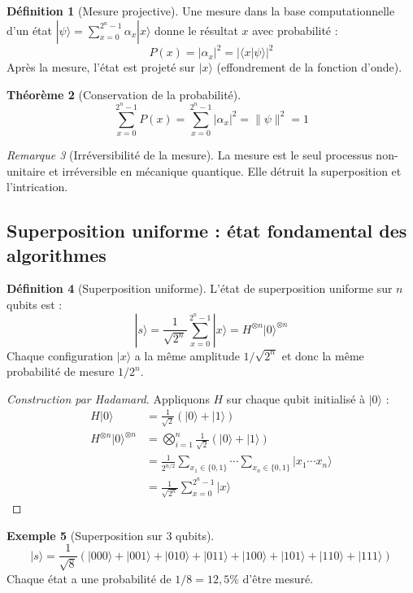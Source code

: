 \documentclass[12pt,a4paper]{article}
\newtheorem{theorem}{Théorème}[section]
\theoremstyle{definition}
\newtheorem{definition}[theorem]{Définition}
\newtheorem{example}[theorem]{Exemple}
\theoremstyle{remark}
\newtheorem{remark}[theorem]{Remarque}
\begin{document}
\begin{definition}[Mesure projective]
Une mesure dans la base computationnelle d'un état $|\psi\rangle = \sum_{x=0}^{2^n-1} \alpha_x |x\rangle$ donne le résultat $x$ avec probabilité :
\[
P(x) = |\alpha_x|^2 = |\langle x | \psi \rangle|^2
\]
Après la mesure, l'état est projeté sur $|x\rangle$ (effondrement de la fonction d'onde).
\end{definition}

\begin{theorem}[Conservation de la probabilité]
\[
\sum_{x=0}^{2^n-1} P(x) = \sum_{x=0}^{2^n-1} |\alpha_x|^2 = \|\psi\|^2 = 1
\]
\end{theorem}

\begin{remark}[Irréversibilité de la mesure]
La mesure est le seul processus non-unitaire et irréversible en mécanique quantique. Elle détruit la superposition et l'intrication.
\end{remark}

\subsection{Superposition uniforme : état fondamental des algorithmes}

\begin{definition}[Superposition uniforme]
L'état de superposition uniforme sur $n$ qubits est :
\[
|s\rangle = \frac{1}{\sqrt{2^n}} \sum_{x=0}^{2^n-1} |x\rangle = H^{\otimes n} |0\rangle^{\otimes n}
\]
Chaque configuration $|x\rangle$ a la même amplitude $1/\sqrt{2^n}$ et donc la même probabilité de mesure $1/2^n$.
\end{definition}

\begin{proof}[Construction par Hadamard]
Appliquons $H$ sur chaque qubit initialisé à $|0\rangle$ :
\begin{align*}
H|0\rangle &= \frac{1}{\sqrt{2}}(|0\rangle + |1\rangle) \\
H^{\otimes n}|0\rangle^{\otimes n} &= \bigotimes_{i=1}^n \frac{1}{\sqrt{2}}(|0\rangle + |1\rangle) \\
&= \frac{1}{2^{n/2}} \sum_{x_1 \in \{0,1\}} \cdots \sum_{x_n \in \{0,1\}} |x_1 \cdots x_n\rangle \\
&= \frac{1}{\sqrt{2^n}} \sum_{x=0}^{2^n-1} |x\rangle
\end{align*}
\end{proof}

\begin{example}[Superposition sur 3 qubits]
\[
|s\rangle = \frac{1}{\sqrt{8}}(|000\rangle + |001\rangle + |010\rangle + |011\rangle + |100\rangle + |101\rangle + |110\rangle + |111\rangle)
\]
Chaque état a une probabilité de $1/8 = 12{,}5\%$ d'être mesuré.
\end{example}
\end{document}
